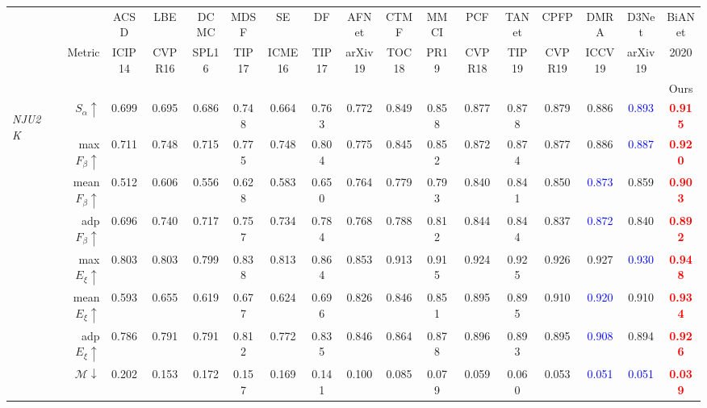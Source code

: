 \documentclass[journal]{IEEEtran}
\newcommand{\trb}[1]{\textbf{\textcolor{red}{#1}}}
\newcommand{\tbb}[1]{\textcolor{blue}{#1}}
\newcommand{\NJU}{\textit{NJU2K}~\cite{ju2014depth}}
\begin{document}
\begin{table*}[t!]
\begin{tabular}{lr|ccccc|ccccccccc|c}
		&  & ACSD & LBE & DCMC & MDSF   & SE   & DF   & AFNet& CTMF & MMCI & PCF   & TANet& CPFP & DMRA & D3Net & BiANet \\
		& Metric & \scriptsize{ICIP14} & \scriptsize{CVPR16} & \scriptsize{SPL16} & \scriptsize{TIP17}   & \scriptsize{ICME16}   & \scriptsize{TIP17}   & \scriptsize{arXiv19} & \scriptsize{TOC18} & \scriptsize{PR19} & \scriptsize{CVPR18}   & \scriptsize{TIP19} & \scriptsize{CVPR19} & \scriptsize{ICCV19} & \scriptsize{arXiv19} & \scriptsize{2020} \\
		&  & \cite{ju2014depth} & \cite{feng2016local} & \cite{cong2016saliency} & \cite{song2017depth} & \cite{guo2016salient} & \cite{qu2017rgbd} & \cite{wang2019adaptive} & \cite{han2017cnns} & \cite{chen2019multi} & \cite{chen2018progressively} & \cite{chen2019three}& \cite{zhao2019Contrast} & \cite{piao2019depth} & \cite{fan2019D3Net}& Ours\\
		\hline
		\multirow{8}{*}{\begin{sideways}\NJU\end{sideways}}
		& $S_{\alpha}\uparrow$    & 0.699 & 0.695 & 0.686 & 0.748 & 0.664 & 0.763 & 0.772 & 0.849 & 0.858 & 0.877 & 0.878 & 0.879 & 0.886 & \tbb{0.893} & \trb{0.915} \\
		& max $F_{\beta}\uparrow$     & 0.711 & 0.748 & 0.715 & 0.775 & 0.748 & 0.804 & 0.775 & 0.845 & 0.852 & 0.872 & 0.874 & 0.877 & 0.886 & \tbb{0.887} & \trb{0.920} \\
		& mean $F_{\beta}\uparrow$     & 0.512 & 0.606 & 0.556 & 0.628 & 0.583 & 0.650 & 0.764 & 0.779 & 0.793 & 0.840 & 0.841 & 0.850 & \tbb{0.873} & 0.859 & \trb{0.903} \\
		& adp $F_{\beta}\uparrow$     & 0.696 & 0.740 & 0.717 & 0.757 & 0.734 & 0.784 & 0.768 & 0.788 & 0.812 & 0.844 & 0.844 & 0.837 & \tbb{0.872} & 0.840 & \trb{0.892} \\
		& max $E_{\xi}\uparrow$       & 0.803 & 0.803 & 0.799 & 0.838 & 0.813 & 0.864 & 0.853 & 0.913 & 0.915 & 0.924 & 0.925 & 0.926 & 0.927 & \tbb{0.930} & \trb{0.948} \\
		& mean $E_{\xi}\uparrow$     & 0.593 & 0.655 & 0.619 & 0.677 & 0.624 & 0.696 & 0.826 & 0.846 & 0.851 & 0.895 & 0.895 & 0.910 & \tbb{0.920} & 0.910 & \trb{0.934} \\
		& adp $E_{\xi}\uparrow$     & 0.786 & 0.791 & 0.791 & 0.812 & 0.772 & 0.835 & 0.846 & 0.864 & 0.878 & 0.896 & 0.893 & 0.895 & \tbb{0.908} & 0.894 & \trb{0.926} \\
		& $\mathcal{M}\downarrow$ & 0.202 & 0.153 & 0.172 & 0.157 & 0.169 & 0.141 & 0.100 & 0.085 & 0.079 & 0.059 & 0.060 & 0.053 & \tbb{0.051} & \tbb{0.051} & \trb{0.039} \\

\end{tabular}
\end{table*}
\end{document}

